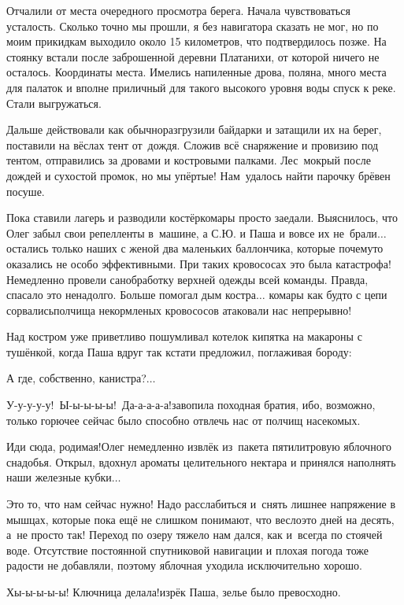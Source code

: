 Отчалили от места очередного просмотра берега. Начала чувствоваться усталость. Сколько точно мы прошли, я без навигатора сказать не мог, но по моим прикидкам выходило около 15 километров, что подтвердилось позже. На стоянку встали после заброшенной деревни Платанихи, от которой ничего не осталось. Координаты места\mdash \CoordsLidSeventeenFirst. Имелись напиленные дрова, поляна, много места для палаток и вполне приличный для такого высокого уровня воды спуск к реке. Стали выгружаться. 

Дальше действовали как обычно\mdash разгрузили байдарки и затащили их на берег, поставили на вёслах тент от~дождя. Сложив всё снаряжение и провизию под тентом, отправились за дровами и костровыми палками. Лес~мокрый после дождей и сухостой промок, но мы упёртые! Нам~удалось найти парочку брёвен посуше. 

Пока ставили лагерь и разводили костёр\mdash комары просто заедали. Выяснилось, что Олег забыл свои репелленты в~машине, а С.Ю. и Паша и вовсе их не~брали$\ldots$ остались только наших с женой два маленьких баллончика, которые почему\sdash то оказались не особо эффективными. При таких кровососах это была катастрофа! Немедленно провели санобработку верхней одежды всей команды. Правда, спасало это ненадолго. Больше помогал дым костра$\ldots$ комары как будто с цепи сорвались\mdash полчища некормленых кровососов атаковали нас непрерывно!

Над костром уже приветливо пошумливал котелок кипятка на макароны с тушёнкой, когда Паша вдруг так кстати предложил, поглаживая бороду: 

\diagdash А где, собственно, канистра?$\ldots$

\diagdash У-у-у-у-у!~Ы-ы-ы-ы-ы!~Да-а-а-а-а!\mdash завопила походная братия, ибо, возможно, только горючее сейчас было способно отвлечь нас от полчищ насекомых.
 
\diagdash Иди сюда, родимая!\mdash Олег немедленно извлёк из~пакета пятилитровую яблочного снадобья. Открыл, вдохнул ароматы целительного нектара и принялся наполнять наши железные кубки$\ldots$

Это то, что нам сейчас нужно! Надо расслабиться и~снять лишнее напряжение в мышцах, которые пока ещё не слишком понимают, что весло\mdash это дней на десять, а~не просто так! Переход по озеру тяжело нам дался, как и~всегда по стоячей воде. Отсутствие постоянной спутниковой навигации и плохая погода тоже радости не добавляли, поэтому яблочная уходила исключительно хорошо.

\diagdash Хы-ы-ы-ы-ы! Ключница делала!\mdash изрёк Паша, зелье было превосходно.

